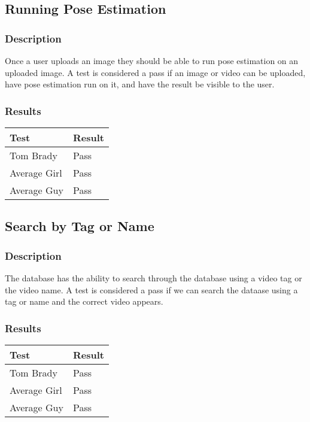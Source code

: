 \documentclass{scrreprt}
\begin{document}
\subsection{Running Pose Estimation}
\subsubsection{Description}

Once a user uploads an image they should be able to run pose estimation on an
uploaded image. A test is considered a pass if an image or video can be
uploaded, have pose estimation run on it, and have the result be visible to the
user.

\subsubsection{Results}
 \centering
 \begin{tabular}{||p{2.5cm}|p{2.5cm}||}
 \hline
 \bf Test & \bf Result\\
 \hline\hline
  Tom Brady & Pass  \\ 
   \hline\hline
  Average Girl & Pass  \\
   \hline\hline
  Average Guy & Pass  \\
\hline

 \hline
 \end{tabular}

\subsection{Search by Tag or Name}
\subsubsection{Description}

The database has the ability to search through the database using a video tag
or the video name. A test is considered a pass if we can search the dataase
using a tag or name and the correct video appears.

\subsubsection{Results}
 \centering
 \begin{tabular}{||p{2.5cm}|p{2.5cm}||}
 \hline
 \bf Test & \bf Result\\
 \hline\hline
  Tom Brady & Pass  \\ 
   \hline\hline
  Average Girl & Pass  \\
   \hline\hline
  Average Guy & Pass  \\
\hline

 \hline
 \end{tabular}
\end{document}
